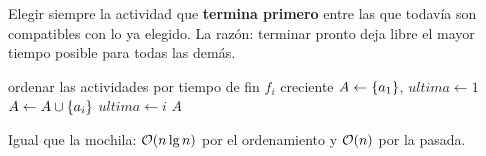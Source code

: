 \documentclass[11pt,letterpaper]{article}
\begin{document}
Elegir siempre la actividad que \textbf{termina primero} entre las que
todavía son compatibles con lo ya elegido. La razón: terminar pronto
deja libre el mayor tiempo posible para todas las demás.

\begin{algorithm}[H]
\caption{\textsc{Seleccion-Actividades}$(s, f)$}
\begin{algorithmic}[1]
\State ordenar las actividades por tiempo de fin $f_i$ creciente
\State $A \gets \left\{ a_1 \right\}$, \quad $\mathit{ultima} \gets 1$
    \State $A \gets A \cup \left\{ a_i \right\}$
    \State $\mathit{ultima} \gets i$
  \EndIf
\EndFor
\State \Return $A$
\end{algorithmic}
\end{algorithm}

Igual que la mochila: $\mathcal{O}\!\left(n \lg n\right)$ por el ordenamiento y $\mathcal{O}\!\left(n\right)$
por la pasada.
\end{document}
